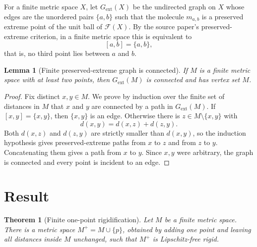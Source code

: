\documentclass[11pt]{article}
\newtheorem{theorem}{Theorem}
\newtheorem{lemma}{Lemma}
\newcommand{\F}{\mathcal F}
\begin{document}
For a finite metric space \(X\), let \(G_{\mathrm{ext}}(X)\) be the undirected graph on \(X\) whose edges are the unordered pairs \(\{a,b\}\) such that the molecule \(m_{a,b}\) is a preserved extreme point of the unit ball of \(\F(X)\).  By the source paper's preserved-extreme criterion, in a finite metric space this is equivalent to
\[
  [a,b]=\{a,b\},
\]
that is, no third point lies between \(a\) and \(b\).

\begin{lemma}[Finite preserved-extreme graph is connected]
\label{lem:connected}
If \(M\) is a finite metric space with at least two points, then \(G_{\mathrm{ext}}(M)\) is connected and has vertex set \(M\).
\end{lemma}

\begin{proof}
Fix distinct \(x,y\in M\).  We prove by induction over the finite set of distances in \(M\) that \(x\) and \(y\) are connected by a path in \(G_{\mathrm{ext}}(M)\).  If \([x,y]=\{x,y\}\), then \(\{x,y\}\) is an edge.  Otherwise there is \(z\in M\setminus\{x,y\}\) with
\[
  d(x,y)=d(x,z)+d(z,y).
\]
Both \(d(x,z)\) and \(d(z,y)\) are strictly smaller than \(d(x,y)\), so the induction hypothesis gives preserved-extreme paths from \(x\) to \(z\) and from \(z\) to \(y\).  Concatenating them gives a path from \(x\) to \(y\).  Since \(x,y\) were arbitrary, the graph is connected and every point is incident to an edge.
\end{proof}

\section*{Result}

\begin{theorem}[Finite one-point rigidification]
\label{thm:finite}
Let \(M\) be a finite metric space.  There is a metric space \(M^+=M\cup\{p\}\), obtained by adding one point and leaving all distances inside \(M\) unchanged, such that \(M^+\) is Lipschitz-free rigid.
\end{theorem}
\end{document}
